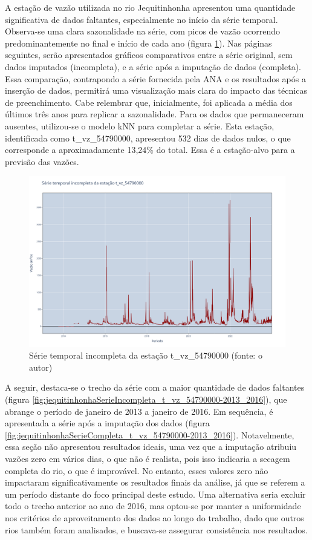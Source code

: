 A estação de vazão utilizada no rio Jequitinhonha apresentou uma quantidade significativa de dados faltantes, especialmente no início da série temporal. Observa-se uma clara sazonalidade na série, com picos de vazão ocorrendo predominantemente no final e início de cada ano (figura \ref{fig:jequitinhonhaSerieIncompleta_t_vz_54790000}). Nas páginas seguintes, serão apresentados gráficos comparativos entre a série original, sem dados imputados (incompleta), e a série após a imputação de dados (completa). Essa comparação, contrapondo a série fornecida pela ANA e os resultados após a inserção de dados, permitirá uma visualização mais clara do impacto das técnicas de preenchimento. Cabe relembrar que, inicialmente, foi aplicada a média dos últimos três anos para replicar a sazonalidade. Para os dados que permaneceram ausentes, utilizou-se o modelo kNN para completar a série. Esta estação, identificada como t\_vz\_54790000, apresentou 532 dias de dados nulos, o que corresponde a aproximadamente 13,24\% do total. Essa é a estação-alvo para a previsão das vazões.

\begin{figure}[!h]
\centering
\includegraphics[scale=0.25]{Figuras/jequiti/jequitinhonhaSerieIncompleta_t_vz_54790000.png}
\caption{Série temporal incompleta da estação t\_vz\_54790000 (fonte: o autor)}
\label{fig:jequitinhonhaSerieIncompleta_t_vz_54790000}
\end{figure}

A seguir, destaca-se o trecho da série com a maior quantidade de dados faltantes (figura \ref{fig:jequitinhonhaSerieIncompleta_t_vz_54790000-2013_2016}), que abrange o período de janeiro de 2013 a janeiro de 2016. Em sequência, é apresentada a série após a imputação dos dados (figura \ref{fig:jequitinhonhaSerieCompleta_t_vz_54790000-2013_2016}). Notavelmente, essa seção não apresentou resultados ideais, uma vez que a imputação atribuiu vazões zero em vários dias, o que não é realista, pois isso indicaria a secagem completa do rio, o que é improvável. No entanto, esses valores zero não impactaram significativamente os resultados finais da análise, já que se referem a um período distante do foco principal deste estudo. Uma alternativa seria excluir todo o trecho anterior ao ano de 2016, mas optou-se por manter a uniformidade nos critérios de aproveitamento dos dados ao longo do trabalho, dado que outros rios também foram analisados, e buscava-se assegurar consistência nos resultados.

